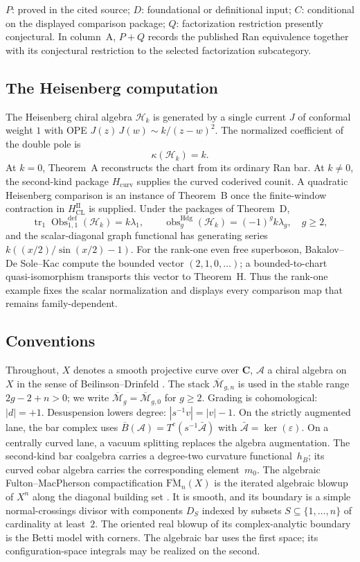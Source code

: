 \documentclass[11pt]{article}
\theoremstyle{plain}
\theoremstyle{definition}
\theoremstyle{remark}
\newcommand{\Mbar}{\overline{\mathcal{M}}}
\newcommand{\FM}{\mathrm{FM}}
\newcommand{\cA}{\mathcal{A}}
\newcommand{\cH}{\mathcal{H}}
\newcommand{\barB}{\overline{B}}
\newcommand{\Abar}{\bar{\cA}}
\begin{document}
\noindent
{\footnotesize $P$: proved in the cited source; $D$: foundational or
definitional input; $C$: conditional on the displayed comparison
package; $Q$: factorization restriction presently conjectural.  In
column~A, $P+Q$ records the published Ran equivalence together with
its conjectural restriction to the selected factorization
subcategory.}

\subsection{The Heisenberg computation}

The Heisenberg chiral algebra $\cH_k$ is generated by a single
current $J$ of conformal weight $1$ with OPE
$J(z)\,J(w) \sim k/(z-w)^2$.  The normalized coefficient of the
double pole is
\[
 \kappa(\cH_k)=k.
\]
At $k=0$, Theorem~A reconstructs the chart from its ordinary Ran bar.
At $k\ne0$, the second-kind package $H_{\mathrm{curv}}$ supplies the
curved coderived counit.  A quadratic Heisenberg comparison is an
instance of Theorem~B once the finite-window contraction in
$H_{\mathrm{CL}}^{\mathrm{II}}$ is supplied.  Under
the packages of Theorem~D,
\[
 \operatorname{tr}_1\operatorname{Obs}^{\mathrm{def}}_{1,1}(\cH_k)
 =k\lambda_1,
 \qquad
 \operatorname{obs}^{\mathrm{Hdg}}_g(\cH_k)=(-1)^gk\lambda_g,
 \quad g\ge2,
\]
and the scalar-diagonal graph functional has generating series
$k((x/2)/\sin(x/2)-1)$.  For the rank-one even free superboson,
Bakalov--De Sole--Kac compute the bounded vector $(2,1,0,\ldots)$;
a bounded-to-chart quasi-isomorphism transports this vector to
Theorem~H.  Thus the rank-one example fixes the scalar normalization
and displays every comparison map that remains family-dependent.


\subsection{Conventions}

Throughout, $X$ denotes a smooth projective curve over
$\mathbf{C}$, $\cA$ a chiral algebra on $X$ in the sense of
Beilinson--Drinfeld \cite{BD04}.  The stack $\Mbar_{g,n}$ is used in
the stable range $2g-2+n>0$; we write $\Mbar_g=\Mbar_{g,0}$ for
$g\geq2$.
Grading is cohomological: $|d| = +1$. Desuspension lowers degree:
$|s^{-1}v| = |v| - 1$.  On the strictly augmented lane, the bar
complex uses
$\barB(\cA)=T^c(s^{-1}\Abar)$ with
$\Abar=\ker(\varepsilon)$.  On a centrally curved lane, a vacuum
splitting replaces the algebra augmentation.  The second-kind bar
coalgebra carries a degree-two curvature functional~$h_B$; its curved
cobar algebra carries the corresponding element~$m_0$.
The algebraic Fulton--MacPherson compactification
$\overline{\FM}_n(X)$ is the iterated algebraic blowup of $X^n$ along
the diagonal building set \cite{FM94}.  It is smooth, and its boundary
is a simple normal-crossings divisor with components $D_S$ indexed by
subsets $S\subseteq\{1,\ldots,n\}$ of cardinality at least~$2$.
The oriented real blowup of its complex-analytic boundary is the Betti
model with corners.  The algebraic bar uses the first space; its
configuration-space integrals may be realized on the second.
\end{document}
